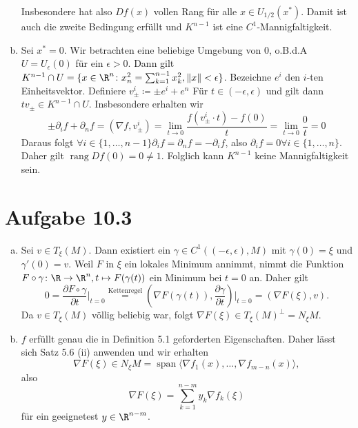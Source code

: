 \documentclass{article}
\newcommand{\norm}[1]{\left\lVert #1 \right\rVert}
\begin{document}
\begin{enumerate}[(a)]
\[        \]
        Insbesondere hat also $Df(x)$ vollen Rang für alle $x\in U_{1/2}(x^*)$.
        Damit ist auch die zweite Bedingung erfüllt und $K^{n-1}$ ist eine $C^1$-Mannigfaltigkeit.
        \item Sei $x^* = 0$. Wir betrachten eine beliebige Umgebung von $0$, o.B.d.A $U = U_{\epsilon}(0)$ für ein $\epsilon >0$.
        Dann gilt $K^{n-1} \cap U = \{x \in \R^n\colon x_n^2 = \sum_{k = 1}^{n-1} x_k^2, \norm{x} < \epsilon\}$.
        Bezeichne $e^i$ den $i$-ten Einheitsvektor.
        Definiere $v_\pm^i \coloneqq \pm e^i + e^n$
        Für $t\in (-\epsilon, \epsilon)$ und gilt dann $t v_\pm \in K^{n-1} \cap U$.
        Insbesondere erhalten wir 
        \[
            \pm \partial_i f + \partial_n f = (\nabla f, v_\pm^i) = \lim\limits_{t \to 0} \frac{f(v_\pm^i\cdot t) - f(0)}{t} = \lim\limits_{t \to 0} \frac{0}{t} = 0
        \]
        Daraus folgt $\forall i \in \{1,\dots, n-1\} \partial_i f = \partial_n f = -\partial_i f$, also $\partial_i f = 0\forall i\in \{1,\dots, n\}$.
        Daher gilt $\operatorname{rang} Df(0) = 0 \neq 1$. Folglich kann $K^{n-1}$ keine Mannigfaltigkeit sein.
    \end{enumerate}
    \section*{Aufgabe 10.3}
    \begin{enumerate}[(a)]
        \item Sei $v\in T_\xi(M)$. 
        Dann existiert ein $\gamma \in C^1((-\epsilon, \epsilon), M)$ mit $\gamma(0) = \xi$ und $\gamma'(0) = v$.
        Weil $F$ in $\xi$ ein lokales Minimum annimmt, nimmt die Funktion 
        $F\circ \gamma \colon \R \to \R^n, t \mapsto F(\gamma(t))$ ein Minimum bei $t = 0$ an.
        Daher gilt 
        \[
            0 = \frac{\partial F\circ \gamma}{\partial t}\bigg|_{t = 0} 
            \overset{\text{Kettenregel}}{=} (\nabla F(\gamma(t)), \frac{\partial \gamma}{\partial t})\bigg|_{t=0} 
            = (\nabla F(\xi), v).
        \]
        Da $v \in T_\xi (M)$ völlig beliebig war, folgt $\nabla F(\xi) \in T_\xi (M)^{\bot} = N_{\xi}M$.
        \item $f$ erfüllt genau die in Definition 5.1 geforderten Eigenschaften. 
        Daher lässt sich Satz 5.6 (ii) anwenden und wir erhalten
        \[ 
            \nabla F(\xi) \in N_\xi M = \operatorname{span} \langle \nabla f_1(x), \dots, \nabla f_{m-n}(x)\rangle,
        \]
        also 
        \[
            \nabla F(\xi) = \sum_{k = 1}^{n-m} y_k \nabla f_k(\xi)  
        \]
        für ein geeignetest $y \in \R^{n-m}$.
    \end{enumerate}
\end{document}
